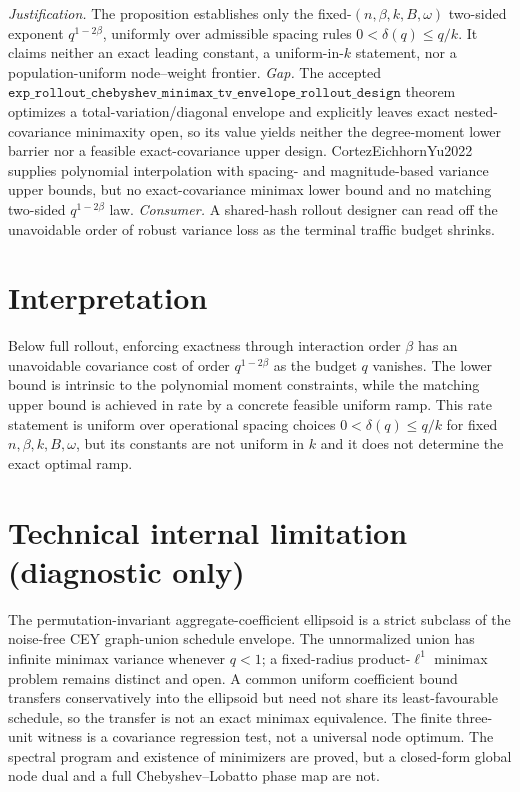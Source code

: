 \documentclass{article}
\begin{document}
\par\smallskip\noindent \textit{Justification.} The proposition establishes only the fixed-\((n,\beta,k,B,\omega)\) two-sided exponent \(q^{1-2\beta}\), uniformly over admissible spacing rules \(0<\delta(q)\le q/k\). It claims neither an exact leading constant, a uniform-in-\(k\) statement, nor a population-uniform node--weight frontier. \textit{Gap.} The accepted \(\texttt{exp\_rollout\_chebyshev\_minimax\_tv\_envelope\_rollout\_design}\) theorem optimizes a total-variation/diagonal envelope and explicitly leaves exact nested-covariance minimaxity open, so its value yields neither the degree-moment lower barrier nor a feasible exact-covariance upper design. CortezEichhornYu2022 supplies polynomial interpolation with spacing- and magnitude-based variance upper bounds, but no exact-covariance minimax lower bound and no matching two-sided \(q^{1-2\beta}\) law. \textit{Consumer.} A shared-hash rollout designer can read off the unavoidable order of robust variance loss as the terminal traffic budget shrinks.

\section{Interpretation}

Below full rollout, enforcing exactness through interaction order \(\beta\) has an unavoidable covariance cost of order \(q^{1-2\beta}\) as the budget \(q\) vanishes. The lower bound is intrinsic to the polynomial moment constraints, while the matching upper bound is achieved in rate by a concrete feasible uniform ramp. This rate statement is uniform over operational spacing choices \(0<\delta(q)\le q/k\) for fixed \(n,\beta,k,B,\omega\), but its constants are not uniform in \(k\) and it does not determine the exact optimal ramp.

\section*{Technical internal limitation (diagnostic only)}

The permutation-invariant aggregate-coefficient ellipsoid is a strict subclass of the noise-free CEY graph-union schedule envelope.  The unnormalized union has infinite minimax variance whenever \(q<1\); a fixed-radius product-\(\ell^1\) minimax problem remains distinct and open.  A common uniform coefficient bound transfers conservatively into the ellipsoid but need not share its least-favourable schedule, so the transfer is not an exact minimax equivalence.  The finite three-unit witness is a covariance regression test, not a universal node optimum.  The spectral program and existence of minimizers are proved, but a closed-form global node dual and a full Chebyshev--Lobatto phase map are not.
\end{document}
